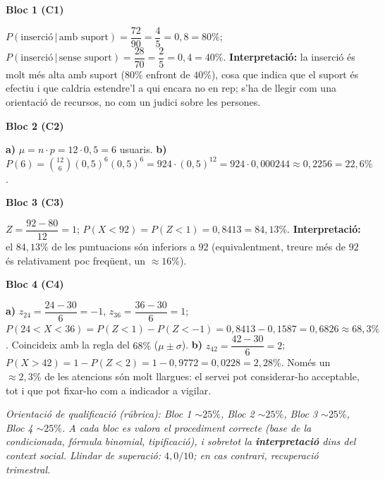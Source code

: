 \newpage
\begin{solucions}

\noindent\textbf{Bloc 1 (C1)}
\begin{sollist}
  \item $P(\text{inserció}\,|\,\text{amb suport})=\dfrac{72}{90}=\dfrac{4}{5}=0,8=80\%$;
        $P(\text{inserció}\,|\,\text{sense suport})=\dfrac{28}{70}=\dfrac{2}{5}=0,4=40\%$.
        \textbf{Interpretació:} la inserció és molt més alta amb suport ($80\%$ enfront de
        $40\%$), cosa que indica que el suport és efectiu i que caldria estendre'l a qui
        encara no en rep; s'ha de llegir com una orientació de recursos, no com un judici
        sobre les persones.
\end{sollist}

\noindent\textbf{Bloc 2 (C2)}
\begin{sollist}\setcounter{enumi}{1}
  \item \textbf{a)} $\mu=n\cdot p=12\cdot 0,5=6$ usuaris. \quad
        \textbf{b)} $P(6)=\binom{12}{6}(0,5)^6(0,5)^6=924\cdot(0,5)^{12}=
        924\cdot 0,000244\approx 0,2256=22,6\%$.
\end{sollist}

\noindent\textbf{Bloc 3 (C3)}
\begin{sollist}\setcounter{enumi}{2}
  \item $Z=\dfrac{92-80}{12}=1$; $P(X<92)=P(Z<1)=0,8413=84,13\%$. \textbf{Interpretació:}
        el $84,13\%$ de les puntuacions són inferiors a $92$ (equivalentment, treure més
        de $92$ és relativament poc freqüent, un $\approx 16\%$).
\end{sollist}

\noindent\textbf{Bloc 4 (C4)}
\begin{sollist}\setcounter{enumi}{3}
  \item \textbf{a)} $z_{24}=\dfrac{24-30}{6}=-1$, $z_{36}=\dfrac{36-30}{6}=1$;
        $P(24<X<36)=P(Z<1)-P(Z<-1)=0,8413-0,1587=0,6826\approx 68,3\%$. Coincideix amb la
        regla del $68\%$ ($\mu\pm\sigma$).
        \textbf{b)} $z_{42}=\dfrac{42-30}{6}=2$; $P(X>42)=1-P(Z<2)=1-0,9772=0,0228=2,28\%$.
        Només un $\approx 2,3\%$ de les atencions són molt llargues: el servei pot
        considerar-ho acceptable, tot i que pot fixar-ho com a indicador a vigilar.
\end{sollist}

\end{solucions}

\noindent\small\textit{Orientació de qualificació (rúbrica): Bloc 1 $\sim 25\%$,
Bloc 2 $\sim 25\%$, Bloc 3 $\sim 25\%$, Bloc 4 $\sim 25\%$. A cada bloc es valora el
procediment correcte (base de la condicionada, fórmula binomial, tipificació), i sobretot
la \textbf{interpretació} dins del context social. Llindar de superació: $4,0/10$; en cas
contrari, recuperació trimestral.}
